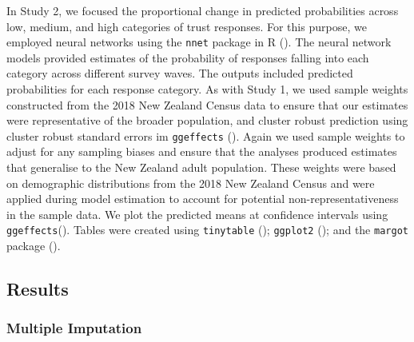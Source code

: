\documentclass[
  single column]{article}
\begin{document}
In Study 2, we focused the proportional change in predicted
probabilities across low, medium, and high categories of trust
responses. For this purpose, we employed neural networks using the
\texttt{nnet} package in R (). The neural network models provided estimates of the probability
of responses falling into each category across different survey waves.
The outputs included predicted probabilities for each response category.
As with Study 1, we used sample weights constructed from the 2018 New
Zealand Census data to ensure that our estimates were representative of
the broader population, and cluster robust prediction using cluster
robust standard errors im \texttt{ggeffects}
(). Again we used sample
weights to adjust for any sampling biases and ensure that the analyses
produced estimates that generalise to the New Zealand adult population.
These weights were based on demographic distributions from the 2018 New
Zealand Census and were applied during model estimation to account for
potential non-representativeness in the sample data. We plot the
predicted means at confidence intervals using
\texttt{ggeffects}(). Tables
were created using \texttt{tinytable}
(); \texttt{ggplot2}
(); and the \texttt{margot}
package ().

\subsection{Results}\label{results}

\subsubsection{Multiple Imputation}\label{multiple-imputation}
\end{document}
